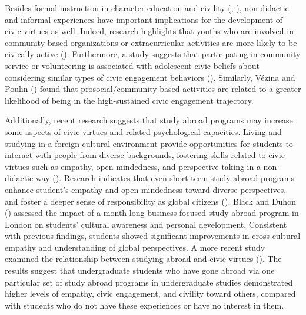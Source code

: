 \documentclass[
  man,
  floatsintext,
  longtable,
  nolmodern,
  notxfonts,
  notimes,
  colorlinks=true,linkcolor=blue,citecolor=blue,urlcolor=blue]{apa7}
\begin{document}
Besides formal instruction in character education and civility
(;
), non-didactic and informal experiences have important
implications for the development of civic virtues as well. Indeed,
research highlights that youths who are involved in community-based
organizations or extracurricular activities are more likely to be
civically active
(). Furthermore, a study suggests that participating in community
service or volunteering is associated with adolescent civic beliefs
about considering similar types of civic engagement behaviors
(). Similarly, Vézina and Poulin
() found
that prosocial/community-based activities are related to a greater
likelihood of being in the high-sustained civic engagement trajectory.

Additionally, recent research suggests that study abroad programs may
increase some aspects of civic virtues and related psychological
capacities. Living and studying in a foreign cultural environment
provide opportunities for students to interact with people from diverse
backgrounds, fostering skills related to civic virtues such as empathy,
open-mindedness, and perspective-taking in a non-didactic way
(). Research indicates that even short-term study abroad
programs enhance student's empathy and open-mindedness toward diverse
perspectives, and foster a deeper sense of responsibility as global
citizens (). Black and Duhon
() assessed the
impact of a month-long business-focused study abroad program in London
on students' cultural awareness and personal development. Consistent
with previous findings, students showed significant improvements in
cross-cultural empathy and understanding of global perspectives. A more
recent study examined the relationship between studying abroad and civic
virtues (). The results suggest that undergraduate students who have gone
abroad via one particular set of study abroad programs in undergraduate
studies demonstrated higher levels of empathy, civic engagement, and
civility toward others, compared with students who do not have these
experiences or have no interest in them.
\end{document}
